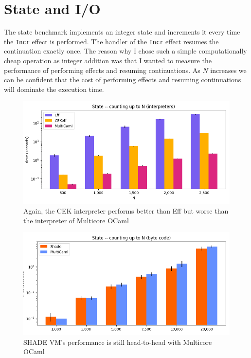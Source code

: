 \documentclass[class=article, crop=false]{standalone}
\begin{document}
\section{State and I/O}

The state benchmark implements
an integer state and increments it every time the \verb|Incr| effect is performed. The handler of the \verb|Incr| effect
resumes the continuation exactly once. The reason why I chose such a simple computationally cheap operation as integer addition
was that I wanted to measure the performance of performing effects and resuming continuations. As $N$ increases we can be confident
that the cost of performing effects and resuming continuations will dominate the execution time.

\begin{figure}
    \centering
    \includegraphics[width=35em]{eval_plots/interp_state.png}
    \caption{Again, the CEK interpreter performs better than Eff but worse than the interpreter of Multicore OCaml}
    \label{fig:state-interpreters}
\end{figure}

\begin{figure}
    \centering
    \includegraphics[width=35em]{eval_plots/comp_state.png}
    \caption{SHADE VM's performance is still head-to-head with Multicore OCaml}
    \label{fig:state-bytecode}
\end{figure}
\end{document}
